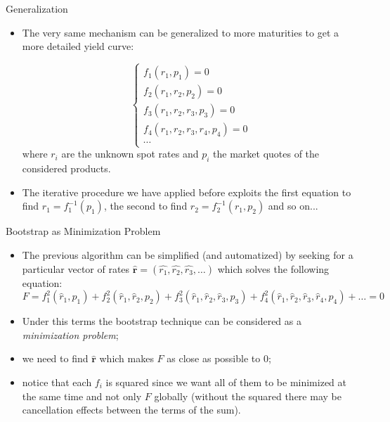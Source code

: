 \documentclass{beamer}
\begin{document}
\begin{frame}[fragile]{Generalization}
\begin{itemize}
\item The very same mechanism can be generalized to more maturities to get a more detailed yield curve: 
 
\begin{equation*}
 \begin{cases}
 f_1(r_1, p_1) = 0 \\
 f_2(r_1, r_2, p_2) = 0 \\
 f_3(r_1, r_2, r_3, p_3) = 0 \\
 f_4(r_1, r_2, r_3, r_4, p_4) = 0 \\
 \cdots
 \end{cases}
 \end{equation*}
where $r_i$ are the unknown spot rates and $p_i$ the market quotes of the considered products. 
 
 \item The iterative procedure we have applied before exploits the first equation to find $r_1 = f_1^{-1}(p_1)$, the second to find $r_2 = f_2^{-1}(r_1, p_2)$ and so on...
\end{itemize}
\end{frame} 

\begin{frame}{Bootstrap as Minimization Problem}
  \begin{itemize}
    \item The previous algorithm can be simplified (and automatized) by seeking for a particular vector of rates $\mathbf{\hat{r}} = (\hat{r_1}, \hat{r_2}, \hat{r_3},\ldots)$ which solves the following equation:
      \begin{equation}
        F = f_1^2(\hat{r}_1,p_1) + f_2^2(\hat{r}_1, \hat{r}_2,p_2) + f_3^2(\hat{r}_1, \hat{r}_2, \hat{r}_3,p_3) + f_4^2(\hat{r}_1, \hat{r}_2, \hat{r}_3, \hat{r}_4,p_4) + \ldots = 0
      \end{equation}
    \item Under this terms the bootstrap technique can be considered as a \emph{minimization problem};
    \item we need to find $\mathbf{\hat{r}}$ which makes $F$ as close as possible to 0;
    \item notice that each $f_i$ is squared since we want all of them to be minimized at the same time and not only $F$ globally (without the squared there may be cancellation effects between the terms of the sum).
  \end{itemize}
 \href{https://colab.research.google.com/drive/1ZPjDST00jXLR1MIXapcyPaNkW-GMNciA?authuser=1\#scrollTo=X-kM9zDOgqDN\&line=1\&uniqifier=1}{}
\end{frame}
\end{document}
